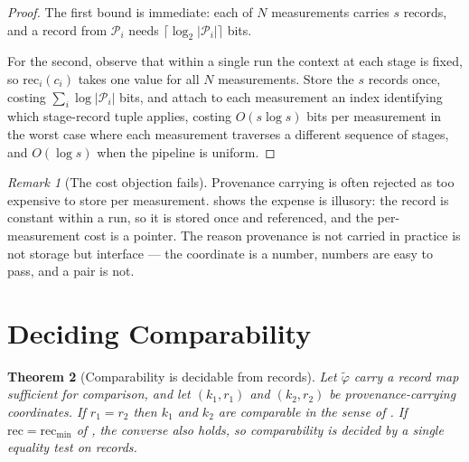 \documentclass[11pt,a4paper]{article}
\newtheorem{theorem}{Theorem}[section]
\theoremstyle{definition}
\theoremstyle{remark}
\newtheorem{remark}[theorem]{Remark}
\newcommand{\Prv}{\mathcal{P}}               %
\newcommand{\rec}{\mathrm{rec}}
\begin{document}
\begin{proof}
The first bound is immediate: each of $N$ measurements carries $s$
records, and a record from $\Prv_i$ needs $\lceil\log_2|\Prv_i|\rceil$
bits.

For the second, observe that within a single run the context at each
stage is fixed, so $\rec_i(c_i)$ takes one value for all $N$
measurements. Store the $s$ records once, costing
$\sum_i \log|\Prv_i|$ bits, and attach to each measurement an index
identifying which stage-record tuple applies, costing $O(s \log s)$ bits
per measurement in the worst case where each measurement traverses a
different sequence of stages, and $O(\log s)$ when the pipeline is
uniform.
\end{proof}

\begin{remark}[The cost objection fails]\label{rem:cost-reading}
Provenance carrying is often rejected as too expensive to store per
measurement.  shows the expense is illusory: the record
is constant within a run, so it is stored once and referenced, and the
per-measurement cost is a pointer. The reason provenance is not carried
in practice is not storage but interface --- the coordinate is a number,
numbers are easy to pass, and a pair is not.
\end{remark}

\section{Deciding Comparability}
\label{sec:comparability}

\begin{theorem}[Comparability is decidable from records]\label{thm:comparability}
Let $\tilde{\varphi}$ carry a record map sufficient for comparison, and
let $(k_1,r_1)$ and $(k_2,r_2)$ be provenance-carrying coordinates. If
$r_1 = r_2$ then $k_1$ and $k_2$ are comparable in the sense of
. If $\rec = \rec_{\min}$ of
, the converse also holds, so comparability is
decided by a single equality test on records.
\end{theorem}
\end{document}
